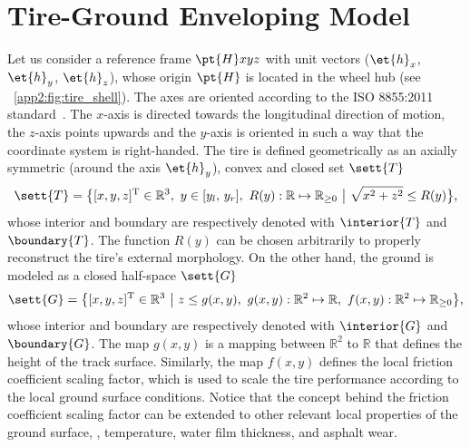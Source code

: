 
\section{Tire-Ground Enveloping Model}
\label{app2:sec:model}

Let us consider a reference frame $\pt{H}xyz$ with unit vectors ($\et{h}_x$, $\et{h}_y$, $\et{h}_z$), whose origin $\pt{H}$ is located in the wheel hub (see \figurename{}~\ref{app2:fig:tire_shell}). The axes are oriented according to the ISO 8855:2011 standard~\cite{iso88552011}. The $x$-axis is directed towards the longitudinal direction of motion, the $z$-axis points upwards and the $y$-axis is oriented in such a way that the coordinate system is right-handed. The tire is defined geometrically as an axially symmetric (around the axis $\et{h}_y$), convex and closed set $\sett{T}$
%
\begin{equation}
  \sett{T} = \big\{ [x, y, z]^\mathrm{T} \in \mathbb{R}^3, ~ y \in [ y_l, \, y_r ], ~ R(y):\mathbb{R} \mapsto \mathbb{R}_{\geq 0} ~ \big\lvert ~ \sqrt{x^2+z^2} \leq R(y) \big\} \text{,}
\end{equation}
%
whose interior and boundary are respectively denoted with $\interior{T}$ and $\boundary{T}$. The function $R(y)$ can be chosen arbitrarily to properly reconstruct the tire's external morphology. On the other hand, the ground is modeled as a closed half-space $\sett{G}$
%
\begin{equation}
  \sett{G} = \big\{ [x, y, z]^\mathrm{T} \in \mathbb{R}^3 ~ \big\lvert ~ z \leq g(x,y), ~ g(x,y): \mathbb{R}^2 \mapsto \mathbb{R}, ~ f(x,y):\mathbb{R}^2 \mapsto \mathbb{R}_{\geq 0}\big\} \text{,}
\end{equation}
%
whose interior and boundary are respectively denoted with $\interior{G}$ and $\boundary{G}$. The map $g(x,y)$ is a mapping between $\mathbb{R}^2$ to $\mathbb{R}$ that defines the height of the track surface. Similarly, the map $f(x,y)$ defines the local friction coefficient scaling factor, which is used to scale the tire performance according to the local ground surface conditions. Notice that the concept behind the friction coefficient scaling factor can be extended to other relevant local properties of the ground surface, \eg{}, temperature, water film thickness, and asphalt wear.

